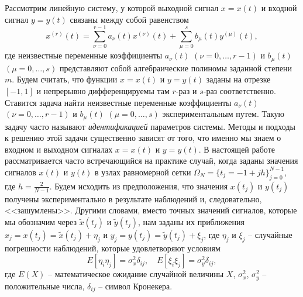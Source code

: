 Рассмотрим линейную систему, у которой выходной сигнал $x=x(t)$ и входной сигнал  $y=y(t)$
связаны между собой  равенством
\begin{equation}\label{idprmeq1.2.21.1}
x^{(r)}(t)=\sum_{\nu=0}^{r-1}a_\nu(t)x^{(\nu)}(t)+\sum_{\mu=0}^s b_\mu(t)y^{(\mu)}(t),
\end{equation}
где неизвестные переменные коэффициенты $a_\nu(t)$ $(\nu=0,\ldots,r-1)$ и $b_\mu(t)$ $(\mu=0,\ldots,s)$ представляют собой алгебраические полиномы  заданной степени $m$. Будем  считать, что функции $x=x(t)$ и  $y=y(t)$ заданы на отрезке $[-1,1]$ и непрерывно дифференцируемы там $r$-раз и $s$-раз соответственно. Ставится задача  найти неизвестные переменные коэффициенты
$a_\nu(t)$ $(\nu=0,\ldots,r-1)$ и $b_\mu(t)$ $(\mu=0,\ldots,s)$ экспериментальным путем. Такую задачу часто называют  \textit{идентификацией} параметров системы. Методы и подходы к решению этой задачи существенно зависят от того, что именно мы знаем о входном и выходном сигналах  $x=x(t)$ и  $y=y(t)$. В настоящей работе рассматривается часто встречающийся на практике случай, когда заданы значения сигналов $x(t)$ и  $y(t)$ в узлах равномерной сетки $\Omega_N=\{t_j=-1+jh\}_{j=0}^{N-1}$, где $h=\frac2{N-1}$.
Будем исходить из предположения, что значения $x(t_j)$ и  $y(t_j)$ получены экспериментально в результате наблюдений и, следовательно, <<зашумлены>>. Другими словами, вместо точных значений сигналов, которые мы обозначим через $\tilde x(t_j)$ и  $\tilde y(t_j)$,   нам заданы их приближения $ x_j=x(t_j)=\tilde x(t_j)+\eta_j$ и  $ y_j=y(t_j)=\tilde y(t_j)+\xi_j $, где $\eta_j$ и $\xi_j$ -- случайные погрешности наблюдений, которые удовлетворяют условиям
\begin{equation}\label{idprmeq1.2.21.2}
E[\eta_i\eta_j]=\sigma_x^2\delta_{ij},  \quad E[\xi_i\xi_j]=\sigma_y^2\delta_{ij},
 \end{equation}
где $E(X)$ -- математическое ожидание случайной величины $X$, $\sigma_x^2$, $\sigma_y^2$ -- положительные числа, $\delta_{ij}$ -- символ Кронекера.

